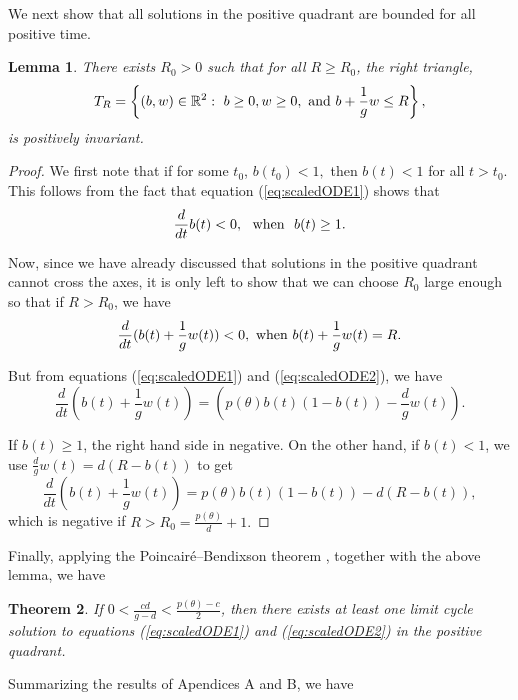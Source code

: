 \documentclass[review,authoryear]{elsarticle}
\newtheorem{theorem}{Theorem}[section]
\newtheorem{lemma}[theorem]{Lemma}
\begin{document}
We next show that all solutions in the positive quadrant are bounded for all positive time.  

\begin{lemma}
There exists $R_{0}>0$  such that for all $R\geq R_{0}$, the right
triangle, 
$$T_{R}=\left\{ \left(b,w\right) \in \mathbb R^{2}:\  b\ge 0, w\ge 0, \ {\rm and}\  b+\frac{1}{g}w\le R\right\}, $$  
is positively invariant.
\end{lemma}

\begin{proof}
  We first note that if for some $t_0$, $b(t_0)< 1,$ then $b(t) < 1$ for all $t>t_0$.  This follows from the fact that equation (\ref{eq:scaledODE1}) shows that 
  $$\frac{d}{dt}b(t) < 0,\  \  {\rm when}\ \ b(t)\ge 1.$$
  
  Now, since we have already discussed that solutions in the positive quadrant cannot cross the axes, it is only left to show that we can choose $R_0$ large enough so that if $R>R_0$, we have
  $$\frac{d}{dt}(b(t)+\frac{1}{g}w(t)) <0,\  {\rm when}\  b(t)+\frac{1}{g}w(t) =R.$$
  
  But from equations (\ref{eq:scaledODE1}) and (\ref{eq:scaledODE2}), we have
  $$\frac{d}{dt}(b(t)+\frac{1}{g}w(t))  =\left( p\left( \theta \right) b(t)\left( 1-b(t)\right) -\frac{d}{g}
w\left( t\right) \right). $$

If $b(t) \ge 1$, the right hand side in negative.  On the other hand, if $b(t) < 1$, we use $\frac{d}{g}w(t) = d(R-b(t))$ to get
$$\frac{d}{dt}(b(t)+\frac{1}{g}w(t)) =p\left( \theta \right) b(t)\left(
1-b(t)\right) -d\left( R-b(t)\right),$$
which is negative if $R>R_0= \frac{p(\theta)}{d} +1.$
\end{proof}

Finally, applying the Poincair\'{e}--Bendixson theorem \citep{nonlinearChaos}, together with the above lemma, we have

\begin{theorem}
  If $0 < \frac{cd}{g-d} < \frac{p(\theta) -c}{2}$, then there exists at least one  limit cycle solution to equations (\ref{eq:scaledODE1}) and (\ref{eq:scaledODE2}) in the positive quadrant.
\end{theorem}

Summarizing the results of Apendices A and B, we have
\end{document}
